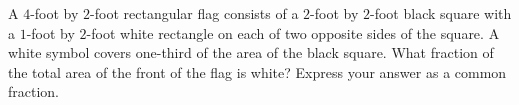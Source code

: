 A $4$-foot by $2$-foot rectangular flag consists of a $2$-foot by $2$-foot black square with a $1$-foot by $2$-foot white rectangle on each of two opposite sides of the square. A white symbol covers one-third of the area of the black square. What fraction of the total area of the front of the flag is white? Express your answer as a common fraction.
